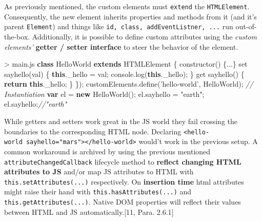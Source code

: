 \documentclass[]{assets/latex/ieee}
\newenvironment{Shaded}{}{}
\newcommand{\KeywordTok}[1]{\textcolor[rgb]{0.00,0.44,0.13}{\textbf{{#1}}}}
\newcommand{\StringTok}[1]{\textcolor[rgb]{0.25,0.44,0.63}{{#1}}}
\newcommand{\CommentTok}[1]{\textcolor[rgb]{0.38,0.63,0.69}{\textit{{#1}}}}
\newcommand{\VariableTok}[1]{\textcolor[rgb]{0.10,0.09,0.49}{{#1}}}
\newcommand{\ControlFlowTok}[1]{\textcolor[rgb]{0.00,0.44,0.13}{\textbf{{#1}}}}
\newcommand{\OperatorTok}[1]{\textcolor[rgb]{0.40,0.40,0.40}{{#1}}}
\newcommand{\AttributeTok}[1]{\textcolor[rgb]{0.49,0.56,0.16}{{#1}}}
\newcommand{\NormalTok}[1]{{#1}}
\begin{document}
As previously mentioned, the custom elements must \texttt{extend} the
\texttt{HTMLElement}. Consequently, the new element inherits properties
and methods from it (and it's parent \texttt{Element}) and things like
\texttt{id,\ class,\ addEventListner,\ ...} run out-of-the-box.
Additionally, it is possible to define custom attributes using the
\emph{custom elements'} \textbf{getter / setter interface} to steer the
behavior of the element.

\begin{Shaded}
\begin{Highlighting}[]
\OperatorTok{>} \VariableTok{main}\NormalTok{.}\AttributeTok{js}
\KeywordTok{class} \NormalTok{HelloWorld }\KeywordTok{extends} \NormalTok{HTMLElement }\OperatorTok{\{}
  \AttributeTok{constructor}\NormalTok{() }\OperatorTok{\{}\NormalTok{...}\OperatorTok{\}}
  \NormalTok{set }\AttributeTok{sayhello}\NormalTok{(val) }\OperatorTok{\{}
    \KeywordTok{this}\NormalTok{.}\AttributeTok{_hello} \OperatorTok{=} \NormalTok{val}\OperatorTok{;}
    \VariableTok{console}\NormalTok{.}\AttributeTok{log}\NormalTok{(}\KeywordTok{this}\NormalTok{.}\AttributeTok{_hello}\NormalTok{)}\OperatorTok{;}
  \OperatorTok{\}}
  \NormalTok{get }\AttributeTok{sayhello}\NormalTok{() }\OperatorTok{\{}
    \ControlFlowTok{return} \KeywordTok{this}\NormalTok{.}\AttributeTok{_hello}\OperatorTok{;}
  \OperatorTok{\}}
\OperatorTok{\}}\NormalTok{)}\OperatorTok{;}
\VariableTok{customElements}\NormalTok{.}\AttributeTok{define}\NormalTok{(}\StringTok{'hello-world'}\OperatorTok{,} \NormalTok{HelloWorld)}\OperatorTok{;}
\CommentTok{// Instantiation}
\KeywordTok{var} \NormalTok{el }\OperatorTok{=} \KeywordTok{new} \AttributeTok{HelloWorld}\NormalTok{()}\OperatorTok{;}
\VariableTok{el}\NormalTok{.}\AttributeTok{sayhello} \OperatorTok{=} \StringTok{"earth"}\OperatorTok{;}
\VariableTok{el}\NormalTok{.}\AttributeTok{sayhello}\OperatorTok{;}\CommentTok{//"earth"}
\end{Highlighting}
\end{Shaded}

While getters and setters work great in the JS world they fail crossing
the boundaries to the corresponding HTML node. Declaring
\texttt{\textless{}hello-world\ sayhello="mars"\textgreater{}\textless{}/hello-world\textgreater{}}
would't work in the previous setup. A common workaround is archived by
using the previous mentioned \texttt{attributeChangedCallback} lifecycle
method to \textbf{reflect changing HTML attributes to JS} and/or map JS
attributes to HTML with \texttt{this.setAttributes(...)} respectively.
On \textbf{insertion time} html attributes might raise their hand with
\texttt{this.hasAttributes(...)} and \texttt{this.getAttributes(...)}.
Native DOM properties will reflect their values between HTML and JS
automatically.{[}11, Para. 2.6.1{]}
\end{document}
